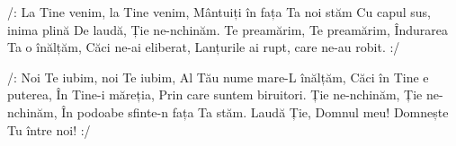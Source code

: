 \beginverse
/: La Tine venim, la Tine venim,
Mântuiți în fața Ta noi stăm
Cu capul sus, inima plină
De laudă, Ție ne-nchinăm.
Te preamărim, Te preamărim,
Îndurarea Ta o înălțăm,
Căci ne-ai eliberat,
Lanțurile ai rupt, care ne-au robit. :/
\endverse

\beginchorus
/: Noi Te iubim, noi Te iubim,
Al Tău nume mare-L înălțăm,
Căci în Tine e puterea,
În Tine-i măreția,
Prin care suntem biruitori.
Ție ne-nchinăm, Ție ne-nchinăm,
În podoabe sfinte-n fața Ta stăm.
Laudă Ție, Domnul meu!
Domnește Tu între noi! :/
\endchorus
\endsong